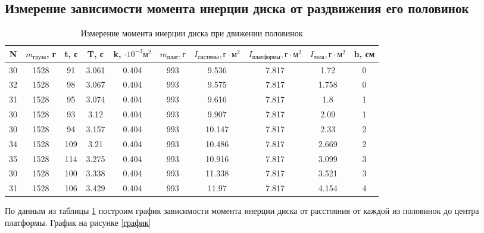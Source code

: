 \documentclass[a4, 12pt]{article}
\begin{document}
\subsection{Измерение зависимости момента инерции диска от раздвижения его половинок}
\begin{table} \label{Половинки} \caption{Измерение момента инерции диска при движении половинок} \begin{tabular}{|c|c|c|c|c|c|c|c|c|c|} \hline N & $m_\text{груза}$, г & t, с & T, с & k, $\cdot 10^{-3}\text{м}^2$ & $m_\text{плат}, г$ & $I_\text{системы}, \text{г}\cdot \text{м}^2$ &$I_\text{платформы}, \text{г}\cdot \text{м}^2$ & $I_\text{тела}, \text{г}\cdot \text{м}^2$ & h, см \\ \hline 30 & 1528 & 91 & 3.061 & 0.404 & 993 & 9.536 & 7.817 & 1.72 & 0 \\ \hline 32 & 1528 & 98 & 3.067 & 0.404 & 993 & 9.575 & 7.817 & 1.758 & 0 \\ \hline 31 & 1528 & 95 & 3.074 & 0.404 & 993 & 9.616 & 7.817 & 1.8 & 1 \\ \hline 30 & 1528 & 93 & 3.12 & 0.404 & 993 & 9.907 & 7.817 & 2.09 & 1 \\ \hline 30 & 1528 & 94 & 3.157 & 0.404 & 993 & 10.147 & 7.817 & 2.33 & 2 \\ \hline 34 & 1528 & 109 & 3.21 & 0.404 & 993 & 10.486 & 7.817 & 2.669 & 2 \\ \hline 35 & 1528 & 114 & 3.275 & 0.404 & 993 & 10.916 & 7.817 & 3.099 & 3 \\ \hline 30 & 1528 & 100 & 3.338 & 0.404 & 993 & 11.338 & 7.817 & 3.521 & 3 \\ \hline 31 & 1528 & 106 & 3.429 & 0.404 & 993 & 11.97 & 7.817 & 4.154 & 4 \\ \hline \end{tabular} \end{table}
По данным из таблицы \ref{Половинки} построим график зависимости момента инерции диска от расстояния от каждой из половинок до центра платформы. График на рисунке \ref{график} 
\end{document}
